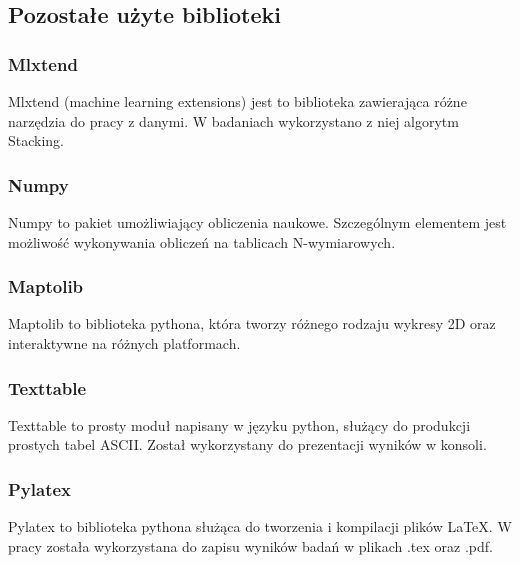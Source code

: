 \subsection{Pozostałe użyte biblioteki}
\subsubsection{Mlxtend}
Mlxtend (machine learning extensions)\cite{mlxtend} jest to biblioteka zawierająca różne narzędzia do pracy z danymi. W badaniach wykorzystano z niej algorytm Stacking.
\subsubsection{Numpy}
Numpy to pakiet umożliwiający obliczenia naukowe. Szczególnym elementem jest możliwość wykonywania obliczeń na tablicach N-wymiarowych. 
\subsubsection{Maptolib}
Maptolib to biblioteka pythona, która tworzy różnego rodzaju wykresy 2D oraz interaktywne na różnych platformach.
\subsubsection{Texttable}
Texttable to prosty moduł napisany w języku python, służący do produkcji prostych tabel ASCII. Został wykorzystany do prezentacji wyników w konsoli.
\subsubsection{Pylatex}
Pylatex to biblioteka pythona służąca do tworzenia i kompilacji plików LaTeX. W pracy została wykorzystana do zapisu wyników badań w plikach .tex oraz .pdf.

